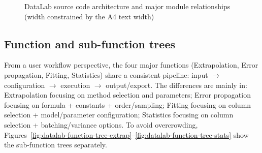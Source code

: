 \documentclass[a4paper,11pt]{article}
\begin{document}
\begin{figure}[htbp]
  \caption{DataLab source code architecture and major module relationships (width constrained by the A4 text width)}
  \label{fig:datalab-framework}
\end{figure}

\subsection{Function and sub-function trees}

From a user workflow perspective, the four major functions (Extrapolation, Error propagation, Fitting, Statistics) share a consistent pipeline: input $\rightarrow$ configuration $\rightarrow$ execution $\rightarrow$ output/export. The differences are mainly in: Extrapolation focusing on method selection and parameters; Error propagation focusing on formula + constants + order/sampling; Fitting focusing on column selection + model/parameter configuration; Statistics focusing on column selection + batching/variance options. To avoid overcrowding, Figures~\ref{fig:datalab-function-tree-extrap}--\ref{fig:datalab-function-tree-stats} show the sub-function trees separately.
\end{document}
